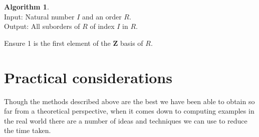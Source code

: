 \documentclass[12pt,a4paper,abstracton,bibtotoc]{scrreprt}
\theoremstyle{definition}
\newtheorem{alg}{Algorithm}
\newcommand{\ZZ}{\mathbf{Z}}
\renewcommand{\O}{\mathcal{O}}
\begin{document}
\begin{alg}~\\
Input: Natural number $I$ and an order $R$.\\
Output: All suborders of $R$ of index $I$ in $R$.\\
\begin{algorithm}[H]
Ensure 1 is the first element of the $\ZZ$ basis of $R$.\\
\end{algorithm}
\end{alg}




\section{Practical considerations}
Though the methods described above are the best we have been able to obtain so far from a theoretical perspective, when it comes down to computing examples in the real world there are a number of ideas and techniques we can use to reduce the time taken.
\end{document}
